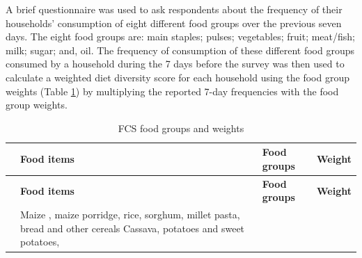 \documentclass[12pt,a4paper]{article}
\begin{document}
A brief questionnaire was used to ask respondents about the frequency of their households' consumption of eight different food groups over the previous seven days. The eight food groups are: main staples; pulses; vegetables; fruit; meat/fish; milk; sugar; and, oil. The frequency of consumption of these different food groups consumed by a household during the 7 days before the survey was then used to calculate a weighted diet diversity score for each household using the food group weights (Table \ref{tab:fcsWeights}) by multiplying the reported 7-day frequencies with the food group weights.

\newpage

\begin{longtable}[]{@{}cllr@{}}
\caption{\label{tab:fcsWeights} FCS food groups and weights}\tabularnewline
\toprule
\begin{minipage}[b]{0.07\columnwidth}\centering
\strut
\end{minipage} & \begin{minipage}[b]{0.47\columnwidth}\raggedright
\textbf{Food items}\strut
\end{minipage} & \begin{minipage}[b]{0.20\columnwidth}\raggedright
\textbf{Food groups}\strut
\end{minipage} & \begin{minipage}[b]{0.15\columnwidth}\raggedleft
\textbf{Weight}\strut
\end{minipage}\tabularnewline
\midrule
\endfirsthead
\toprule
\begin{minipage}[b]{0.07\columnwidth}\centering
\strut
\end{minipage} & \begin{minipage}[b]{0.47\columnwidth}\raggedright
\textbf{Food items}\strut
\end{minipage} & \begin{minipage}[b]{0.20\columnwidth}\raggedright
\textbf{Food groups}\strut
\end{minipage} & \begin{minipage}[b]{0.15\columnwidth}\raggedleft
\textbf{Weight}\strut
\end{minipage}\tabularnewline
\midrule
\endhead
\begin{minipage}[t]{0.07\columnwidth}\centering
1\strut
\end{minipage} & \begin{minipage}[t]{0.47\columnwidth}\raggedright
Maize , maize porridge, rice, sorghum,
millet pasta, bread and other cereals
Cassava, potatoes and sweet potatoes,

\end{minipage}
\end{longtable}
\end{document}
